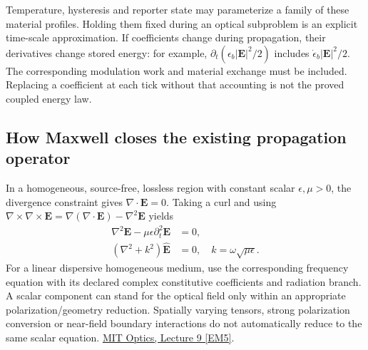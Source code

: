Temperature, hysteresis and reporter state may parameterize a family of these
material profiles. Holding them fixed during an optical subproblem is an
explicit time-scale approximation. If coefficients change during propagation,
their derivatives change stored energy: for example,
$\partial_t(\epsilon_b|\mathbf E|^2/2)$ includes
$\dot\epsilon_b|\mathbf E|^2/2$. The corresponding modulation work and
material exchange must be included. Replacing a coefficient at each tick
without that accounting is not the proved coupled energy law.

\subsection{How Maxwell closes the existing propagation operator}
\label{sec:r13-em-propagation}

In a homogeneous, source-free, lossless region with constant scalar
$\epsilon,\mu>0$, the divergence constraint gives $\nabla\cdot\mathbf E=0$.
Taking a curl and using $\nabla\times\nabla\times\mathbf E
=\nabla(\nabla\cdot\mathbf E)-\nabla^2\mathbf E$ yields
\begin{align}
 \nabla^2\mathbf E-\mu\epsilon\partial_t^2\mathbf E&=0,\nonumber\\
 (\nabla^2+k^2)\widehat{\mathbf E}&=0,
 \quad k=\omega\sqrt{\mu\epsilon}.
 \label{eq:r13-em-wave}
\end{align}
For a linear dispersive homogeneous medium, use the corresponding frequency
equation with its declared complex constitutive coefficients and radiation
branch. A scalar component can stand for the optical field only within an
appropriate polarization/geometry reduction. Spatially varying tensors,
strong polarization conversion or near-field boundary interactions do not
automatically reduce to the same scalar equation.
\href{https://ocw.mit.edu/courses/2-71-optics-spring-2014/e6cfb73b15ef5b0610fe662794eb3205_MIT2_71S14_lec9_notes.pdf}{MIT Optics, Lecture 9 [EM5]}.

